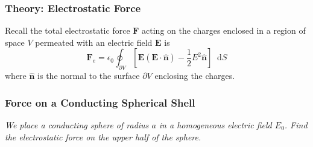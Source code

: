 \documentclass[11pt, a4paper]{article}
\newcommand{\diff}{\mathop{}\!\mathrm{d}} %
\renewcommand{\vec}[1]{\bm{#1}} %
\newcommand{\uvec}[1]{\hat{\vec{#1}}} %
\newcommand{\E}{\vec{E}} %
\newcommand{\e}{\epsilon_{0}}  %
\begin{document}
\subsubsection{Theory: Electrostatic Force}
Recall the total electrostatic force $ \vec{F} $ acting on the charges enclosed in a region of space $ V $ permeated with an electric field $ \E $ is
\begin{equation*}
	\vec{F}_{e} = \e \oint_{\partial V}\left[\E(\E\cdot \uvec{n}) - \frac{1}{2}E^{2} \uvec{n}\right] \diff S
\end{equation*}
where $ \uvec{n} $ is the normal to the surface $ \partial V $ enclosing the charges.


\subsubsection{Force on a Conducting Spherical Shell}
\textit{We place a conducting sphere of radius $ a $ in a homogeneous electric field $ E_{0} $. Find the electrostatic force on the upper half of the sphere.}
\end{document}
